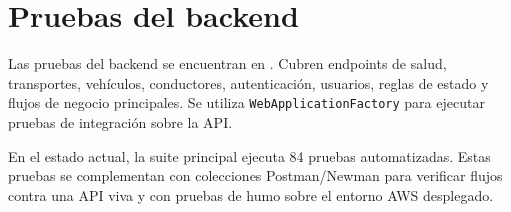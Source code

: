 \section{Pruebas del backend}
\label{sec:pruebas-backend}

Las pruebas del backend se encuentran en . Cubren endpoints de salud, transportes, vehículos, conductores, autenticación, usuarios, reglas de estado y flujos de negocio principales. Se utiliza \texttt{WebApplicationFactory} para ejecutar pruebas de integración sobre la API.

En el estado actual, la suite principal ejecuta 84 pruebas automatizadas. Estas pruebas se complementan con colecciones Postman/Newman para verificar flujos contra una API viva y con pruebas de humo sobre el entorno AWS desplegado.
